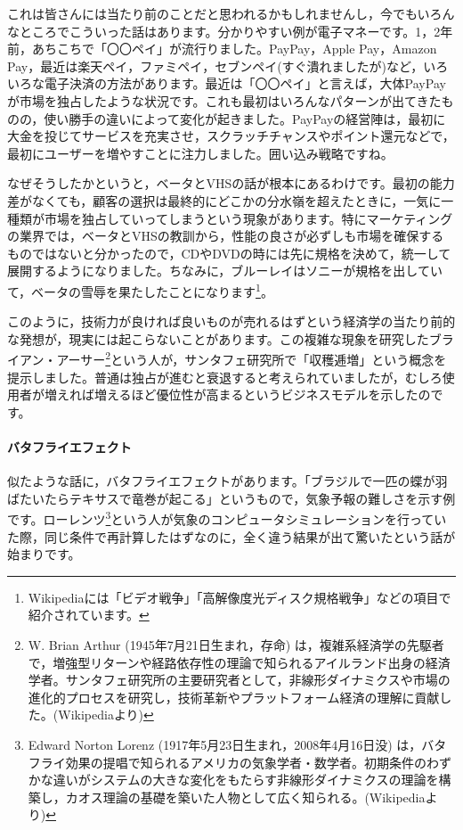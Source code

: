 \documentclass{ltjsbook}
\begin{document}
これは皆さんには当たり前のことだと思われるかもしれませんし，今でもいろんなところでこういった話はあります。分かりやすい例が電子マネーです。1，2年前，あちこちで「〇〇ペイ」が流行りました。PayPay，Apple Pay，Amazon Pay，最近は楽天ペイ，ファミペイ，セブンペイ(すぐ潰れましたが)など，いろいろな電子決済の方法があります。最近は「〇〇ペイ」と言えば，大体PayPayが市場を独占したような状況です。これも最初はいろんなパターンが出てきたものの，使い勝手の違いによって変化が起きました。PayPayの経営陣は，最初に大金を投じてサービスを充実させ，スクラッチチャンスやポイント還元などで，最初にユーザーを増やすことに注力しました。囲い込み戦略ですね。

なぜそうしたかというと，ベータとVHSの話が根本にあるわけです。最初の能力差がなくても，顧客の選択は最終的にどこかの分水嶺を超えたときに，一気に一種類が市場を独占していってしまうという現象があります。特にマーケティングの業界では，ベータとVHSの教訓から，性能の良さが必ずしも市場を確保するものではないと分かったので，CDやDVDの時には先に規格を決めて，統一して展開するようになりました。ちなみに，ブルーレイはソニーが規格を出していて，ベータの雪辱を果たしたことになります\footnote{Wikipediaには「ビデオ戦争」「高解像度光ディスク規格戦争」などの項目で紹介されています。}。

このように，技術力が良ければ良いものが売れるはずという経済学の当たり前的な発想が，現実には起こらないことがあります。この複雑な現象を研究したブライアン・アーサー\footnote{W. Brian Arthur (1945年7月21日生まれ，存命) は，複雑系経済学の先駆者で，増強型リターンや経路依存性の理論で知られるアイルランド出身の経済学者。サンタフェ研究所の主要研究者として，非線形ダイナミクスや市場の進化的プロセスを研究し，技術革新やプラットフォーム経済の理解に貢献した。(Wikipediaより)}という人が，サンタフェ研究所で「収穫逓増」という概念を提示しました。普通は独占が進むと衰退すると考えられていましたが，むしろ使用者が増えれば増えるほど優位性が高まるというビジネスモデルを示したのです。

\paragraph{バタフライエフェクト}

似たような話に，バタフライエフェクトがあります。「ブラジルで一匹の蝶が羽ばたいたらテキサスで竜巻が起こる」というもので，気象予報の難しさを示す例です。ローレンツ\footnote{Edward Norton Lorenz (1917年5月23日生まれ，2008年4月16日没) は，バタフライ効果の提唱で知られるアメリカの気象学者・数学者。初期条件のわずかな違いがシステムの大きな変化をもたらす非線形ダイナミクスの理論を構築し，カオス理論の基礎を築いた人物として広く知られる。(Wikipediaより)}という人が気象のコンピュータシミュレーションを行っていた際，同じ条件で再計算したはずなのに，全く違う結果が出て驚いたという話が始まりです。
\end{document}
